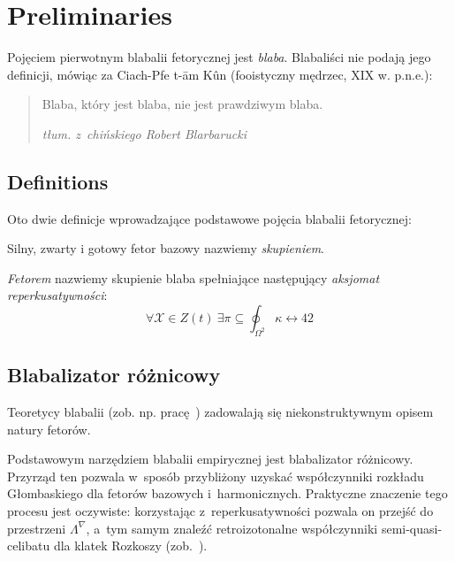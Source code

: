 
\chapter{Preliminaries}\label{r:pre}

Pojęciem pierwotnym blabalii fetorycznej jest \emph{blaba}.
Blabaliści nie podają jego definicji, mówiąc za Ciach-Pfe t-\=am
K\^un (fooistyczny mędrzec, XIX w. p.n.e.):
\begin{quote}
    Blaba, który jest blaba, nie jest prawdziwym blaba.

    \raggedleft\slshape tłum. z~chińskiego Robert Blarbarucki
\end{quote}

\section{Definitions}

Oto dwie definicje wprowadzające podstawowe pojęcia blabalii
fetorycznej:

\begin{defi}\label{skupienie}
    Silny, zwarty i gotowy fetor bazowy nazwiemy \emph{skupieniem}.
\end{defi}

\begin{defi}\label{fetor}
    \emph{Fetorem} nazwiemy skupienie blaba spełniające następujący
    \emph{aksjomat reperkusatywności}:
    $$\forall \mathcal{X}\in Z(t)\ \exists
        \pi\subseteq\oint_{\Omega^2}\kappa\leftrightarrow 42$$
\end{defi}


\section{Blabalizator różnicowy}

Teoretycy blabalii (zob. np. pracę~\cite{grglo}) zadowalają się
niekonstruktywnym opisem natury fetorów.

Podstawowym narzędziem blabalii empirycznej jest blabalizator
różnicowy.  Przyrząd ten pozwala w~sposób przybliżony uzyskać
współczynniki rozkładu Głombaskiego dla fetorów bazowych
i~harmonicznych.  Praktyczne znaczenie tego procesu jest oczywiste:
korzystając z~reperkusatywności pozwala on przejść do przestrzeni
$\Lambda^{\nabla}$, a~tym samym znaleźć retroizotonalne współczynniki
semi-quasi-celibatu dla klatek Rozkoszy (zob.~\cite{JR}).

